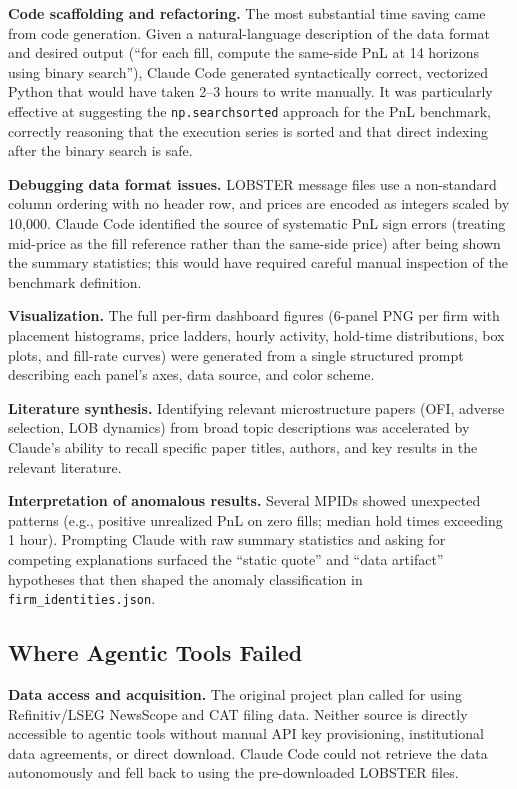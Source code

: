 \documentclass[11pt, letterpaper]{article}
\begin{document}
\textbf{Code scaffolding and refactoring.}
The most substantial time saving came from code generation.
Given a natural-language description of the data format and desired output
(``for each fill, compute the same-side PnL at 14 horizons using binary
search''), Claude Code generated syntactically correct, vectorized Python
that would have taken 2--3 hours to write manually.
It was particularly effective at suggesting the \texttt{np.searchsorted}
approach for the PnL benchmark, correctly reasoning that the execution series
is sorted and that direct indexing after the binary search is safe.

\textbf{Debugging data format issues.}
LOBSTER message files use a non-standard column ordering with no header row,
and prices are encoded as integers scaled by 10,000.
Claude Code identified the source of systematic PnL sign errors
(treating mid-price as the fill reference rather than the same-side price)
after being shown the summary statistics; this would have required careful
manual inspection of the benchmark definition.

\textbf{Visualization.}
The full per-firm dashboard figures (6-panel PNG per firm with placement
histograms, price ladders, hourly activity, hold-time distributions, box
plots, and fill-rate curves) were generated from a single structured prompt
describing each panel's axes, data source, and color scheme.

\textbf{Literature synthesis.}
Identifying relevant microstructure papers (OFI, adverse selection, LOB
dynamics) from broad topic descriptions was accelerated by Claude's ability
to recall specific paper titles, authors, and key results in the relevant
literature.

\textbf{Interpretation of anomalous results.}
Several MPIDs showed unexpected patterns (e.g., positive unrealized PnL on
zero fills; median hold times exceeding 1 hour).
Prompting Claude with raw summary statistics and asking for competing
explanations surfaced the ``static quote'' and ``data artifact'' hypotheses
that then shaped the anomaly classification in \texttt{firm\_identities.json}.

\subsection{Where Agentic Tools Failed}

\textbf{Data access and acquisition.}
The original project plan called for using Refinitiv/LSEG NewsScope and
CAT filing data.
Neither source is directly accessible to agentic tools without manual
API key provisioning, institutional data agreements, or direct download.
Claude Code could not retrieve the data autonomously and fell back to
using the pre-downloaded LOBSTER files.
\end{document}
